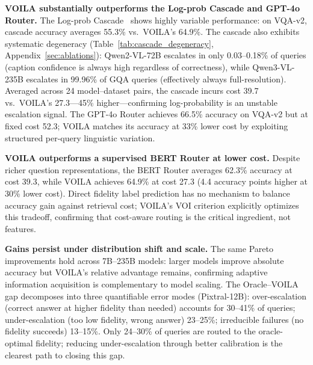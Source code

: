 \textbf{VOILA substantially outperforms the Log-prob Cascade and GPT-4o Router.}
The Log-prob Cascade~\cite{chen2023frugalgpt} shows highly variable performance: on VQA-v2, cascade accuracy averages 55.3\% vs.\ \textsc{VOILA}'s 64.9\%.
The cascade also exhibits systematic degeneracy (Table~\ref{tab:cascade_degeneracy}, Appendix~\ref{sec:ablations}): Qwen2-VL-72B escalates in only 0.03--0.18\% of queries (caption confidence is always high regardless of correctness), while Qwen3-VL-235B escalates in 99.96\% of GQA queries (effectively always full-resolution).
Averaged across 24 model--dataset pairs, the cascade incurs cost 39.7 vs.\ \textsc{VOILA}'s 27.3---45\% higher---confirming log-probability is an unstable escalation signal.
The GPT-4o Router achieves 66.5\% accuracy on VQA-v2 but at fixed cost 52.3; \textsc{VOILA} matches its accuracy at 33\% lower cost by exploiting structured per-query linguistic variation.

\textbf{VOILA outperforms a supervised BERT Router at lower cost.}
Despite richer question representations, the BERT Router averages 62.3\% accuracy at cost 39.3, while \textsc{VOILA} achieves 64.9\% at cost 27.3 (4.4 accuracy points higher at 30\% lower cost).
Direct fidelity label prediction has no mechanism to balance accuracy gain against retrieval cost; \textsc{VOILA}'s VOI criterion explicitly optimizes this tradeoff, confirming that cost-aware routing is the critical ingredient, not features.

\textbf{Gains persist under distribution shift and scale.}
The same Pareto improvements hold across 7B--235B models: larger models improve absolute accuracy but \textsc{VOILA}'s relative advantage remains, confirming adaptive information acquisition is complementary to model scaling.
The Oracle--\textsc{VOILA} gap decomposes into three quantifiable error modes (Pixtral-12B): over-escalation (correct answer at higher fidelity than needed) accounts for 30--41\% of queries; under-escalation (too low fidelity, wrong answer) 23--25\%; irreducible failures (no fidelity succeeds) 13--15\%.
Only 24--30\% of queries are routed to the oracle-optimal fidelity; reducing under-escalation through better calibration is the clearest path to closing this gap.




